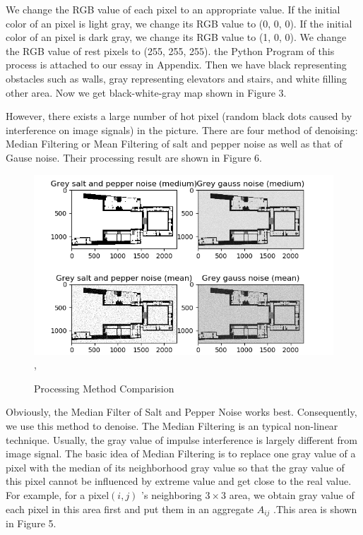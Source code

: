 \documentclass{mcmthesis}
\begin{document}
We change the RGB value of each pixel to an appropriate value. If the initial color of an pixel is light gray, we change its RGB value to (0, 0, 0). If the initial color of an pixel is dark gray, we change its RGB value to (1, 0, 0). We change the RGB value of rest pixels to (255, 255, 255). the Python Program of this process is attached to our essay in Appendix. Then we have black representing obstacles such as walls, gray representing elevators and stairs, and white filling other area. Now we get black-white-gray map shown in Figure 3. 

However, there exists a large number of hot pixel (random black dots caused by interference on image signals) in the picture. There are four method of denoising: Median Filtering or Mean Filtering of salt and pepper noise as well as that of Gause noise. Their processing result are shown in Figure 6. 

\begin{figure}[H]
\includegraphics[scale=0.9]{model_comparision},
\centering\captionsetup{font=small, labelfont=bf}\caption{Processing Method Comparision}
\end{figure}


Obviously, the Median Filter of Salt and Pepper Noise works best. Consequently, we use this method to denoise. The Median Filtering is an typical non-linear technique. Usually, the gray value of impulse interference is largely different from image signal. The basic idea of Median Filtering is to replace one gray value of a pixel with the median of its neighborhood gray value so that the gray value of this pixel cannot be influenced by extreme value and get close to the real value. For example, for a pixel$(i, j)$ ’s neighboring  $3\times 3$ area, we obtain gray value of each pixel in this area first and put them in an aggregate $ A_{ij}$ .This area is shown in Figure 5. 
\end{document}
